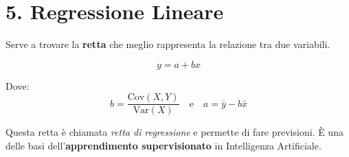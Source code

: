 \documentclass[12pt]{article}
\begin{document}
\section*{5. Regressione Lineare}
Serve a trovare la \textbf{retta} che meglio rappresenta la relazione tra due variabili.

\[
y = a + bx
\]

Dove:
\[
b = \frac{\text{Cov}(X,Y)}{\text{Var}(X)} \quad \text{e} \quad a = \bar{y} - b\bar{x}
\]

Questa retta è chiamata \textit{retta di regressione} e permette di fare previsioni. È una delle basi dell'\textbf{apprendimento supervisionato} in Intelligenza Artificiale.
\end{document}
